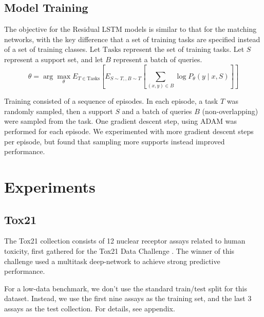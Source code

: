 \documentclass[journal=jacsat,manuscript=article]{achemso}
\begin{document}

\subsection{Model Training}
The objective for the Residual LSTM models is similar to that for the matching networks, with the key difference that a set of training tasks are specified instead of a set of training classes. Let $\text{Tasks}$ represent the set of training tasks. Let $S$ represent a support set, and let $B$ represent a batch of queries.
\[
\theta = \arg\max_\theta E_{T\in\text{Tasks}} \left [ E_{S\sim T,, B\sim T} \left [ \sum_{(x,y) \in B} \log P_\theta(y\mid x, S) \right ] \right ]
\]

 Training consisted of a sequence of episodes. In each episode, a task $T$ was randomly sampled, then a support $S$ and a batch of queries $B$ (non-overlapping) were sampled from the task. One gradient descent step, using ADAM \cite{kingma2014adam} was performed for each episode. We experimented with more gradient descent steps per episode, but found that sampling more supports instead improved performance.
\section{Experiments}
\subsection{Tox21}
The Tox21 collection consists of 12 nuclear receptor assays related to human toxicity, first gathered for the Tox21 Data Challenge \cite{tox21}. The winner of this challenge used a multitask deep-network \cite{unterthiner2015toxicity} to achieve strong predictive performance.

For a low-data benchmark, we don't use the standard train/test split for this dataset. Instead, we use the first nine assays as the training set, and the last 3 assays as the test collection. For details, see appendix.
\end{document}
